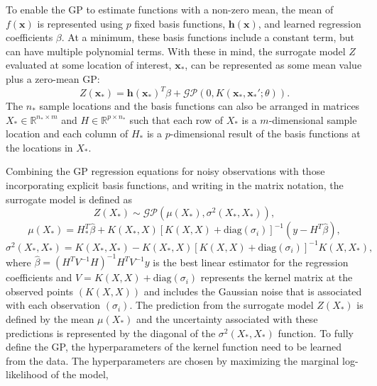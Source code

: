 To enable the GP to estimate functions with a non-zero mean, the mean of $f(\mathbf{x})$ is represented using $p$ fixed basis functions, $\mathbf{h(x)}$, and learned regression coefficients $\beta$.
At a minimum, these basis functions include a constant term, but can have multiple polynomial terms.
With these in mind, the surrogate model $Z$ evaluated at some location of interest, $\mathbf{x}_*$, can be represented as some mean value plus a zero-mean GP: 
\begin{equation}
    Z(\mathbf{x}_*) = \mathbf{h(\mathbf{x}_*)}^T\beta + \mathcal{GP}(0,K(\mathbf{x}_*,\mathbf{x}_*';\theta)).
\end{equation}
The $n_*$ sample locations and the basis functions can also be arranged in matrices $X_* \in \mathbb{R} ^{ n_* \times m}$ and $H \in \mathbb{R} ^{ p \times n_*}$ such that each row of $X_*$ is a $m$-dimensional sample location and each column of $H_*$ is a $p$-dimensional result of the basis functions at the locations in $X_*$.

Combining the GP regression equations for noisy observations with those incorporating explicit basis functions, and writing in the matrix notation, the surrogate model is defined as 
\begin{equation}
    Z(X_*) \sim \mathcal{GP} (\mu(X_*), \sigma^2(X_*,X_*)),
\end{equation}
\begin{equation} \label{equ:mu_gpr}
    \mu(X_*) = H_*^T\hat{\beta} + K(X_*,X)[K(X,X)+\text{diag}(\sigma_i)]^{-1} (y-H^T\hat{\beta}), 
\end{equation}
\begin{equation} \label{equ:sig_gpr}
    \sigma^2(X_*,X_*) = K(X_*,X_*) - K(X_*,X)[K(X,X)+\text{diag}(\sigma_i)]^{-1} K(X,X_*), 
\end{equation}
where $\hat{\beta} = (H^TV^{-1}H)^{-1}H^TV^{-1}y$ is the best linear estimator for the regression coefficients and $V = K(X,X) + \text{diag}(\sigma_i)$ represents the kernel matrix at the observed points $\left ( K(X,X) \right )$ and includes the Gaussian noise that is associated with each observation $\left ( \sigma_i \right )$.
The prediction from the surrogate model $Z(X_*)$ is defined by the mean $\mu(X_*)$ and the uncertainty associated with these predictions is represented by the diagonal of the $\sigma^2(X_*,X_*)$ function.
To fully define the GP, the hyperparameters of the kernel function need to be learned from the data.
The hyperparameters are chosen by maximizing the marginal log-likelihood of the model, 

